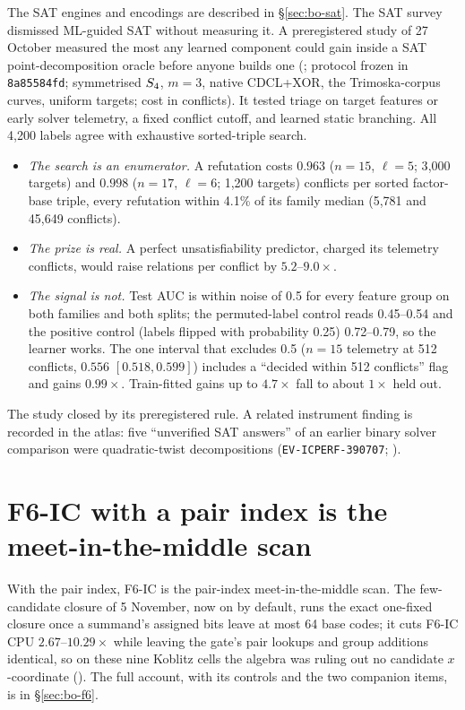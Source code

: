 The SAT engines and encodings are described in \S\ref{sec:bo-sat}. The SAT
survey dismissed ML-guided SAT without measuring it. A preregistered
study of 27 October measured the most any learned component could gain
inside a SAT point-decomposition oracle before anyone builds one
(; protocol frozen in
\texttt{8a85584fd}; symmetrised $S_{4}$, $m=3$, native CDCL+XOR, the
Trimoska-corpus curves, uniform targets; cost in conflicts). It tested
triage on target features or early solver telemetry, a fixed conflict
cutoff, and learned static branching. All 4{,}200 labels agree with
exhaustive sorted-triple search.
\begin{itemize}
\item \emph{The search is an enumerator.} A refutation costs $0.963$
  ($n=15$, $\ell=5$; 3{,}000 targets) and $0.998$ ($n=17$, $\ell=6$; 1{,}200
  targets) conflicts per sorted factor-base triple, every refutation within
  4.1\% of its family median (5{,}781 and 45{,}649 conflicts).
\item \emph{The prize is real.} A perfect unsatisfiability predictor,
  charged its telemetry conflicts, would raise relations per conflict by
  $5.2$--$9.0\times$.
\item \emph{The signal is not.} Test AUC is within noise of 0.5 for every
  feature group on both families and both splits; the permuted-label control
  reads 0.45--0.54 and the positive control (labels flipped with probability
  0.25) 0.72--0.79, so the learner works. The one interval that excludes
  0.5 ($n=15$ telemetry at 512 conflicts, $0.556$ $[0.518,0.599]$) includes a
  ``decided within 512 conflicts'' flag and gains $0.99\times$. Train-fitted
  gains up to $4.7\times$ fall to about $1\times$ held out.
\end{itemize}
The study closed by its preregistered rule. A related instrument finding is recorded in the atlas: five ``unverified
SAT answers'' of an earlier binary solver comparison were quadratic-twist
decompositions (\texttt{EV-ICPERF-390707};
).

\section{F6-IC with a pair index is the meet-in-the-middle scan}\label{sec:bd-f6}

With the pair index, F6-IC is the pair-index meet-in-the-middle scan. The
few-candidate closure of 5 November, now on by default, runs the exact
one-fixed closure once a summand's assigned bits leave at most 64 base
codes; it cuts F6-IC CPU $2.67$--$10.29\times$ while leaving the gate's pair
lookups and group additions identical, so on these nine Koblitz cells the
algebra was ruling out no candidate $x$-coordinate
(). The full account,
with its controls and the two companion items, is in \S\ref{sec:bo-f6}.

